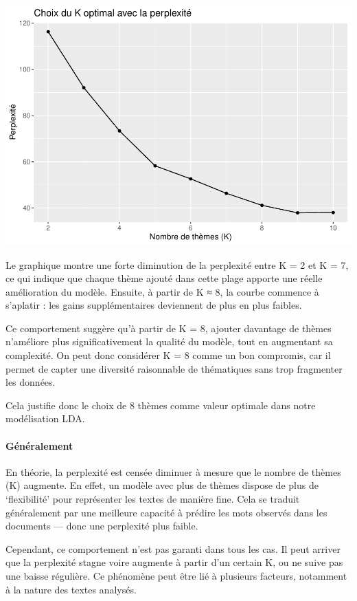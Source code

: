 \documentclass[
]{article}
\begin{document}
\includegraphics{Texte_mining_files/figure-latex/unnamed-chunk-30-1.pdf}

Le graphique montre une forte diminution de la perplexité entre K = 2 et
K = 7, ce qui indique que chaque thème ajouté dans cette plage apporte
une réelle amélioration du modèle. Ensuite, à partir de K ≈ 8, la courbe
commence à s'aplatir : les gains supplémentaires deviennent de plus en
plus faibles.

Ce comportement suggère qu'à partir de K = 8, ajouter davantage de
thèmes n'améliore plus significativement la qualité du modèle, tout en
augmentant sa complexité. On peut donc considérer K = 8 comme un bon
compromis, car il permet de capter une diversité raisonnable de
thématiques sans trop fragmenter les données.

Cela justifie donc le choix de 8 thèmes comme valeur optimale dans notre
modélisation LDA.

\paragraph{Généralement}\label{guxe9nuxe9ralement}

En théorie, la perplexité est censée diminuer à mesure que le nombre de
thèmes (K) augmente. En effet, un modèle avec plus de thèmes dispose de
plus de `flexibilité' pour représenter les textes de manière fine. Cela
se traduit généralement par une meilleure capacité à prédire les mots
observés dans les documents --- donc une perplexité plus faible.

Cependant, ce comportement n'est pas garanti dans tous les cas. Il peut
arriver que la perplexité stagne voire augmente à partir d'un certain K,
ou ne suive pas une baisse régulière. Ce phénomène peut être lié à
plusieurs facteurs, notamment à la nature des textes analysés.
\end{document}
